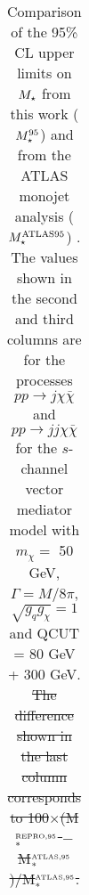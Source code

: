 \begin{flushleft}
\begin{table}[!htbp]
\begin{tabular}{c|c|c|c}
 \hline
 \hline
\end{tabular}
\caption{Comparison of the 95\% CL upper limits on $M_{\star}$ from this work ($M_{\star}^{\tiny 95}$) and from the ATLAS monojet analysis ($M_{\star}^{\tiny \mathrm{ATLAS95}}$) \cite{Aad:2015zva}. The values shown in the second and third columns are for the processes $pp \rightarrow j\chi\bar{\chi}$ and $pp \rightarrow jj\chi\bar{\chi}$ for the $s$-channel vector mediator model with $m_{\chi} = $ 50 GeV, $\Gamma = M/8\pi$, $\sqrt{g_{q}g_{\chi}} = 1$ and QCUT = 80 GeV + 300 GeV. \st{The difference shown in the last column corresponds to 100$\times$(M$_{*}^{\mbox{\tiny REPRO,95}}$ $-$ M$_{*}^{\mbox{\tiny ATLAS,95}}$)/M$_{*}^{\mbox{\tiny ATLAS,95}}$.} }
\label{M_star_limits_monojet}
\end{table}
\end{flushleft}

